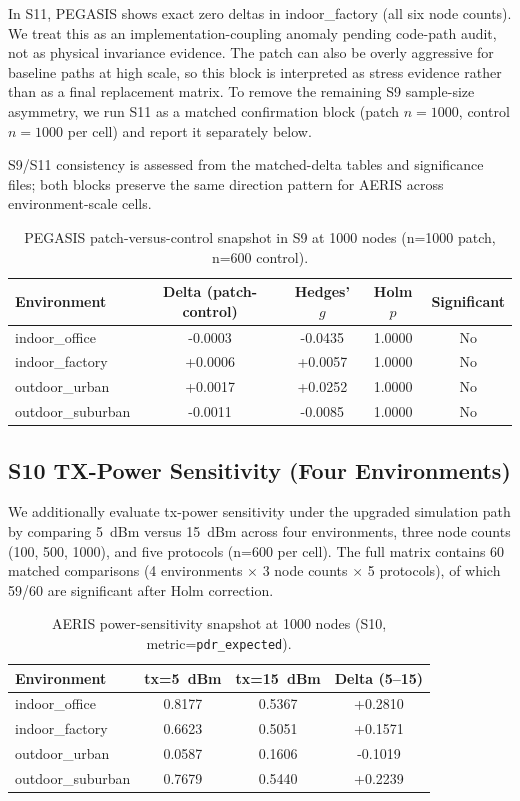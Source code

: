 ﻿\documentclass[sensors,article,submit,moreauthors,pdftex]{Definitions/mdpi}
\begin{document}
In S11, PEGASIS shows exact zero deltas in indoor\_factory (all six node counts). We treat this as an implementation-coupling anomaly pending code-path audit, not as physical invariance evidence. The patch can also be overly aggressive for baseline paths at high scale, so this block is interpreted as stress evidence rather than as a final replacement matrix. To remove the remaining S9 sample-size asymmetry, we run S11 as a matched confirmation block (patch \(n=1000\), control \(n=1000\) per cell) and report it separately below.

S9/S11 consistency is assessed from the matched-delta tables and significance files; both blocks preserve the same direction pattern for AERIS across environment-scale cells.

\begin{table}[H]
\caption{PEGASIS patch-versus-control snapshot in S9 at 1000 nodes (n=1000 patch, n=600 control).}
\label{tab:s9_pegasis_1000}
\centering
\begin{tabular}{lcccc}
\toprule
Environment & Delta (patch-control) & Hedges' $g$ & Holm $p$ & Significant \\
\midrule
indoor\_office    & -0.0003 & -0.0435 & 1.0000 & No \\
indoor\_factory   & +0.0006 & +0.0057 & 1.0000 & No \\
outdoor\_urban    & +0.0017 & +0.0252 & 1.0000 & No \\
outdoor\_suburban & -0.0011 & -0.0085 & 1.0000 & No \\
\bottomrule
\end{tabular}
\end{table}

\subsection{S10 TX-Power Sensitivity (Four Environments)}
We additionally evaluate tx-power sensitivity under the upgraded simulation path by comparing \SI{5}{dBm} versus \SI{15}{dBm} across four environments, three node counts (100, 500, 1000), and five protocols (n=600 per cell). The full matrix contains 60 matched comparisons (4 environments $\times$ 3 node counts $\times$ 5 protocols), of which 59/60 are significant after Holm correction.

\begin{table}[H]
\caption{AERIS power-sensitivity snapshot at 1000 nodes (S10, metric=\texttt{pdr\_expected}).}
\label{tab:s10_aeris_1000}
\centering
\begin{tabular}{lccc}
\toprule
Environment & tx=\SI{5}{dBm} & tx=\SI{15}{dBm} & Delta (5--15) \\
\midrule
indoor\_office    & 0.8177 & 0.5367 & +0.2810 \\
indoor\_factory   & 0.6623 & 0.5051 & +0.1571 \\
outdoor\_urban    & 0.0587 & 0.1606 & -0.1019 \\
outdoor\_suburban & 0.7679 & 0.5440 & +0.2239 \\
\bottomrule
\end{tabular}
\end{table}
\end{document}
